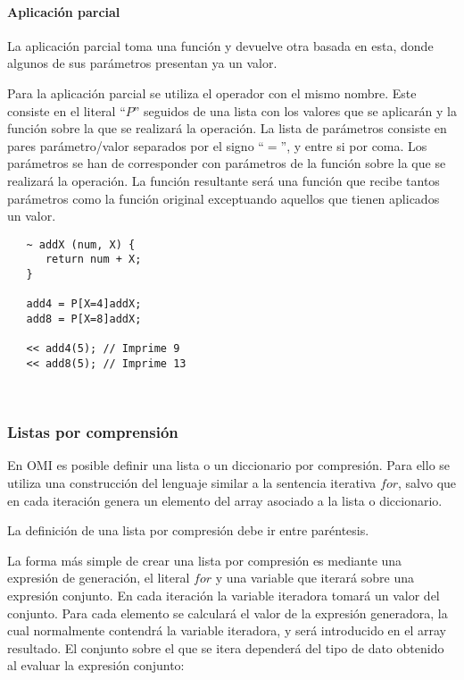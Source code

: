 \paragraph{Aplicación parcial}

La aplicación parcial toma una función y devuelve otra basada en esta, donde algunos de sus parámetros presentan ya un valor.

Para la aplicación parcial se utiliza el operador con el mismo nombre. Este consiste en el literal ``$P$'' seguidos de 
una lista con los valores que se aplicarán y la función sobre la que se realizará la operación. La lista de parámetros consiste 
en pares parámetro/valor separados por el signo ``$=$'', y entre si por coma. Los parámetros se han de corresponder con parámetros de
la función sobre la que se realizará la operación. La función resultante será una función que recibe tantos parámetros como la función original
exceptuando aquellos que tienen aplicados un valor. \\ 

\begin{lstlisting}
   ~ addX (num, X) {
      return num + X;
   }
   
   add4 = P[X=4]addX;
   add8 = P[X=8]addX;
   
   << add4(5); // Imprime 9
   << add8(5); // Imprime 13
\end{lstlisting}
\hfill\\ 

\subsubsection{Listas por comprensión}
En OMI es posible definir una lista o un diccionario por compresión. Para ello se utiliza una construcción del
lenguaje similar a la sentencia iterativa $for$, salvo que en cada iteración genera un elemento del array 
asociado a la lista o diccionario. 

La definición de una lista por compresión debe ir entre paréntesis.

La forma más simple de crear una lista por compresión es mediante una expresión de generación, 
el literal $for$ y una variable que iterará sobre una expresión conjunto. En cada iteración la variable 
iteradora tomará un valor del conjunto. Para cada elemento se calculará el valor de 
la expresión generadora, la cual normalmente contendrá la variable iteradora, y será introducido en 
el array resultado. El conjunto sobre el que se itera dependerá del tipo de dato obtenido al evaluar la expresión conjunto:

